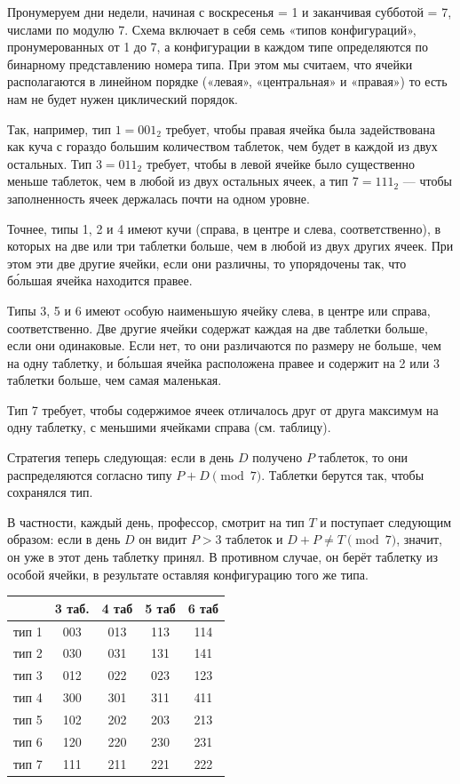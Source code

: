 Пронумеруем дни недели, начиная с воскресенья = 1 и заканчивая субботой = 7, числами по модулю 7.
Схема включает в себя семь «типов конфигураций», пронумерованных от 1 до 7, а конфигурации в каждом типе определяются по бинарному представлению номера типа.
При этом мы считаем, что ячейки располагаются в линейном порядке («левая», «центральная» и «правая») то есть нам не будет нужен циклический порядок.

Так, например, тип $1=001_2$ требует, чтобы правая ячейка была задействована как куча с гораздо большим количеством таблеток, чем будет в каждой из двух остальных.
Тип $3 = 011_2$ требует, чтобы в левой ячейке было существенно меньше таблеток, чем в любой из двух остальных ячеек, а тип 7$ = 111_2$ --- чтобы заполненность ячеек держалась почти на одном уровне.

Точнее, типы 1, 2 и 4 имеют кучи (справа, в центре и слева, соответственно), в которых на две или три таблетки больше, чем в любой из двух других ячеек.
При этом эти две другие ячейки, если они различны, то упорядочены так, что б\'{о}льшая ячейка находится правее.

Типы 3, 5 и 6 имеют oсобую наименьшую ячейку слева, в центре или справа, соответственно.
Две другие ячейки содержат каждая на две таблетки больше, если они одинаковые.
Если нет, то они различаются по размеру не больше, чем на одну таблетку, и б\'{о}льшая ячейка расположена правее и содержит на 2 или 3 таблетки больше, чем самая маленькая.

Тип 7 требует, чтобы содержимое ячеек отличалось друг от друга максимум на одну таблетку, с меньшими ячейками справа (см. таблицу).

Стратегия теперь следующая: если в день $D$ получено $P$ таблеток, то они распределяются согласно типу $P+D \pmod 7$.
Таблетки берутся так, чтобы сохранялся тип.

В частности, каждый день, профессор, смотрит на тип $T$ и поступает следующим образом:
если в день $D$ он видит $P>3$ таблеток и $D+P\ne T\pmod 7$, значит, он уже в этот день таблетку принял.
В противном случае, он берёт таблетку из особой ячейки, в результате оставляя конфигурацию того же типа.

\begin{center}
  \begin{tabular}{ l | c  c c c }
     & 3 таб. & 4 таб & 5 таб & 6 таб \\ \hline
    тип 1 & 003 & 013 & 113 & 114 \\ 
    тип 2 & 030 & 031 & 131 & 141 \\ 
    тип 3 & 012 & 022 & 023 & 123\\ 
    тип 4 & 300 & 301 & 311 & 411\\ 
    тип 5 & 102 & 202 & 203 & 213\\ 
    тип 6 & 120 & 220 & 230 & 231\\ 
    тип 7 & 111 & 211 & 221 & 222
  \end{tabular}
\end{center}

